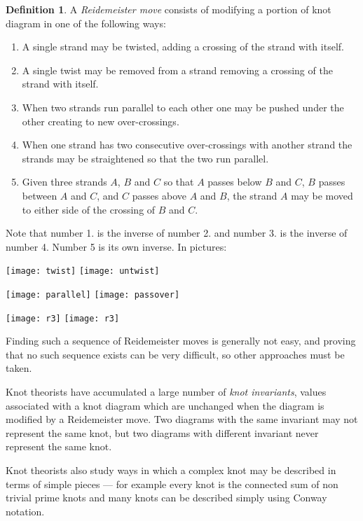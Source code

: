 \documentclass[12pt]{article}
\theoremstyle{definition}
\newtheorem*{defn}{Definition}
\begin{document}
\begin{defn} A \emph{Reidemeister move} consists of modifying a portion of knot diagram in one of the following ways:
\begin{enumerate}
\item A single strand may be twisted, adding a crossing of the strand with itself.
\item A single twist may be removed from a strand removing a crossing of the strand with itself.
\item When two strands run parallel to each other one may be pushed under the other creating to new over-crossings.
\item When one strand has two consecutive over-crossings with another strand the strands may be straightened so that the two run parallel.
\item Given three strands $A$, $B$ and $C$ so that $A$ passes below $B$ and $C$, $B$ passes between $A$ and $C$, and $C$ passes above $A$ and $B$, the strand $A$ may be moved to either side of the crossing of $B$ and $C$.
\end{enumerate}
\end{defn}
Note that number 1. is the inverse of number 2. and number  3. is the inverse of number 4. Number 5 is its own inverse. In pictures:

\begin{center}
\texttt{[image: twist]}
\hskip 0.3in \raisebox{0.5in}{$\longleftrightarrow$}
\texttt{[image: untwist]}

\texttt{[image: parallel]}
\hskip 0.3in \raisebox{0.5in}{$\longleftrightarrow$} \hskip 0.2in
\texttt{[image: passover]}

\texttt{[image: r3]}
\hskip 0.3in \raisebox{0.5in}{$\longleftrightarrow$} \hskip 0.2in
\texttt{[image: r3]}
\end{center}

Finding such a sequence of Reidemeister moves is generally not easy, and proving that no such sequence exists can be very difficult, so other approaches must be taken.

Knot theorists have accumulated a large number of \emph{knot invariants}, values associated with a knot diagram which are unchanged when the diagram is modified by a Reidemeister move. Two diagrams with the same invariant may not represent the same knot, but two diagrams with different invariant never represent the same knot.

Knot theorists also study ways in which a complex knot may be described in terms of simple pieces --- for example every knot is the connected sum of non trivial prime knots and many knots can be described simply using Conway notation.
\end{document}
